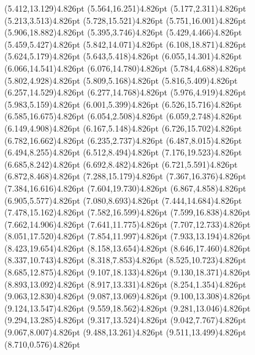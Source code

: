 \documentclass[10pt]{article}
\begin{document}
{{\qdisk(5.412,13.129){4.826pt}%
\qdisk(5.564,16.251){4.826pt}%
\qdisk(5.177,2.311){4.826pt}%
\qdisk(5.213,3.513){4.826pt}%
\qdisk(5.728,15.521){4.826pt}%
\qdisk(5.751,16.001){4.826pt}%
\qdisk(5.906,18.882){4.826pt}%
\qdisk(5.395,3.746){4.826pt}%
\qdisk(5.429,4.466){4.826pt}%
\qdisk(5.459,5.427){4.826pt}%
\qdisk(5.842,14.071){4.826pt}%
\qdisk(6.108,18.871){4.826pt}%
\qdisk(5.624,5.179){4.826pt}%
\qdisk(5.643,5.418){4.826pt}%
\qdisk(6.055,14.301){4.826pt}%
\qdisk(6.066,14.541){4.826pt}%
\qdisk(6.076,14.780){4.826pt}%
\qdisk(5.784,4.688){4.826pt}%
\qdisk(5.802,4.928){4.826pt}%
\qdisk(5.809,5.168){4.826pt}%
\qdisk(5.816,5.409){4.826pt}%
\qdisk(6.257,14.529){4.826pt}%
\qdisk(6.277,14.768){4.826pt}%
\qdisk(5.976,4.919){4.826pt}%
\qdisk(5.983,5.159){4.826pt}%
\qdisk(6.001,5.399){4.826pt}%
\qdisk(6.526,15.716){4.826pt}%
\qdisk(6.585,16.675){4.826pt}%
\qdisk(6.054,2.508){4.826pt}%
\qdisk(6.059,2.748){4.826pt}%
\qdisk(6.149,4.908){4.826pt}%
\qdisk(6.167,5.148){4.826pt}%
\qdisk(6.726,15.702){4.826pt}%
\qdisk(6.782,16.662){4.826pt}%
\qdisk(6.235,2.737){4.826pt}%
\qdisk(6.487,8.015){4.826pt}%
\qdisk(6.494,8.255){4.826pt}%
\qdisk(6.512,8.494){4.826pt}%
\qdisk(7.176,19.523){4.826pt}%
\qdisk(6.685,8.242){4.826pt}%
\qdisk(6.692,8.482){4.826pt}%
\qdisk(6.721,5.591){4.826pt}%
\qdisk(6.872,8.468){4.826pt}%
\qdisk(7.288,15.179){4.826pt}%
\qdisk(7.367,16.376){4.826pt}%
\qdisk(7.384,16.616){4.826pt}%
\qdisk(7.604,19.730){4.826pt}%
\qdisk(6.867,4.858){4.826pt}%
\qdisk(6.905,5.577){4.826pt}%
\qdisk(7.080,8.693){4.826pt}%
\qdisk(7.444,14.684){4.826pt}%
\qdisk(7.478,15.162){4.826pt}%
\qdisk(7.582,16.599){4.826pt}%
\qdisk(7.599,16.838){4.826pt}%
\qdisk(7.662,14.906){4.826pt}%
\qdisk(7.641,11.775){4.826pt}%
\qdisk(7.707,12.733){4.826pt}%
\qdisk(8.051,17.520){4.826pt}%
\qdisk(7.854,11.997){4.826pt}%
\qdisk(7.933,13.194){4.826pt}%
\qdisk(8.423,19.654){4.826pt}%
\qdisk(8.158,13.654){4.826pt}%
\qdisk(8.646,17.460){4.826pt}%
\qdisk(8.337,10.743){4.826pt}%
\qdisk(8.318,7.853){4.826pt}%
\qdisk(8.525,10.723){4.826pt}%
\qdisk(8.685,12.875){4.826pt}%
\qdisk(9.107,18.133){4.826pt}%
\qdisk(9.130,18.371){4.826pt}%
\qdisk(8.893,13.092){4.826pt}%
\qdisk(8.917,13.331){4.826pt}%
\qdisk(8.254,1.354){4.826pt}%
\qdisk(9.063,12.830){4.826pt}%
\qdisk(9.087,13.069){4.826pt}%
\qdisk(9.100,13.308){4.826pt}%
\qdisk(9.124,13.547){4.826pt}%
\qdisk(9.559,18.562){4.826pt}%
\qdisk(9.281,13.046){4.826pt}%
\qdisk(9.294,13.285){4.826pt}%
\qdisk(9.317,13.524){4.826pt}%
\qdisk(9.042,7.767){4.826pt}%
\qdisk(9.067,8.007){4.826pt}%
\qdisk(9.488,13.261){4.826pt}%
\qdisk(9.511,13.499){4.826pt}%
\qdisk(8.710,0.576){4.826pt}%
}}
\end{document}

